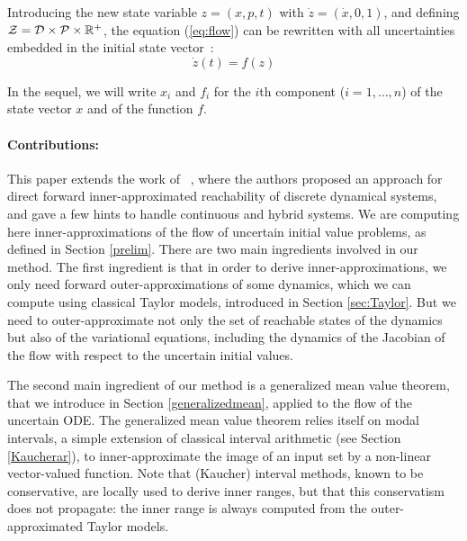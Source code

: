 \documentclass{sig-alternate-05-2015}
\newcommand\ForAuthors[1]%
 {\par\smallskip                     %
  \begin{center}%
   \fbox%
   {\parbox{0.9\linewidth}%
    {\raggedright\sc--- #1}%
   }%
  \end{center}%
  \par\smallskip                     %
 }
\def\R{{\mathbb R}}
\begin{document}
Introducing the new state variable $z=(x,p,t)$ with $\dot z = (\dot x,0,1)$, and defining ${\cal Z} = {\cal D} \times {\cal P} \times \R^+$,
the equation (\ref{eq:flow}) can be rewritten with all uncertainties embedded in the initial state vector~:
\begin{equation} \dot z(t) = f(z)
\label{eq:flowb}
\end{equation}

In the sequel, we will write $x_i$ and $f_i$ for the $i$th component ($i=1,\ldots,n$) of
the state vector $x$ and of the function $f$. 

\paragraph{Contributions:}

This paper extends the work of ~\cite{sas07,hscc14}, where the authors proposed an approach for direct forward inner-approximated reachability of 
discrete dynamical systems, and gave a few hints to handle continuous and hybrid systems. 
We are computing here inner-approximations of the flow of uncertain initial value problems, as defined in Section \ref{prelim}. 
There are two main ingredients involved in our method. The first ingredient is that in order to derive inner-approximations, we only need forward 
outer-approxima\-tions of some dynamics, which we can compute using classical
Taylor models, introduced in Section \ref{sec:Taylor}. But we need to outer-approximate not only 
the set of reachable states of the dynamics but also
of the variational equations, including the dynamics of the Jacobian of the flow with respect to the uncertain
initial values. 

The second main ingredient of our method is 
a generalized mean value theorem, that we introduce in Section \ref{generalizedmean}, applied to the flow of the uncertain ODE. 
The generalized mean value theorem relies itself on modal intervals, a simple 
extension of classical interval arithmetic (see Section \ref{Kaucherar}), to inner-approximate 
the image of an input set by a non-linear vector-valued function. Note that (Kaucher) interval methods, known to be conservative, 
are locally used to derive inner ranges, but that this conservatism does not propagate:
 the  inner range is always computed from the outer-approximated Taylor models. 
\end{document}
